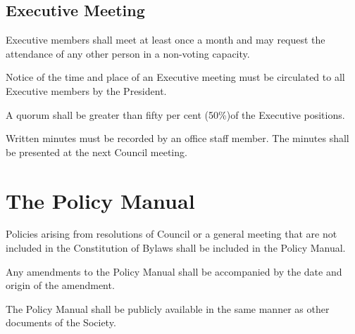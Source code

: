\subsection{Executive Meeting}
\begin{longenum}[ label*=\thesubsection.\arabic*., align=left]
	\item Executive members shall meet at least once a month and may request the attendance of any other person in a non-voting capacity. 

    \item Notice of the time and place of an Executive meeting must be circulated to all Executive members by the President.

    \item A quorum shall be greater than fifty per cent (50\%)of the Executive positions.

    \item Written minutes must be recorded by an office staff member. The minutes shall be presented at the next Council meeting.

\end{longenum}
\newpage

\section{The Policy Manual}
\begin{longenum}[ label*=\thesection.\arabic*., align=left]
	\item Policies arising from resolutions of Council or a general meeting that are not included in the Constitution of Bylaws shall be included in the Policy Manual.
    \item Any amendments to the Policy Manual shall be accompanied by the date and origin of the amendment.
    \item The Policy Manual shall be publicly available in the same manner as other documents of the Society.
\end{longenum}
\newpage

